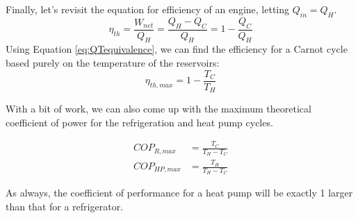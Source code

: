 Finally, let's revisit the equation for efficiency of an engine, letting $Q_{in}=Q_H$.
\begin{equation*}
  \eta_{th} = \frac{W_{net}}{Q_H} = \frac{Q_H - Q_C}{Q_H} = 1 - \frac{Q_C}{Q_H}
\end{equation*}
Using Equation \ref{eq:QTequivalence}, we can find the efficiency for a Carnot cycle based purely on the temperature of the reservoirs:
\begin{equation} \label{eq:CarnotEfficiency}
  \eta_{th, max} = 1 - \frac{T_C}{T_H}
\end{equation}

With a bit of work, we can also come up with the maximum theoretical coefficient of power for the refrigeration and heat pump cycles.

\begin{align}
  \label{eq:CarnotCOPR}  COP_{R, max}  &= \frac{T_C}{T_H - T_C} \\
  \label{eq:CarnotCOPHP} COP_{HP, max} &= \frac{T_H}{T_H - T_C} 
\end{align}

As always, the coefficient of performance for a heat pump will be exactly 1 larger than that for a refrigerator.

